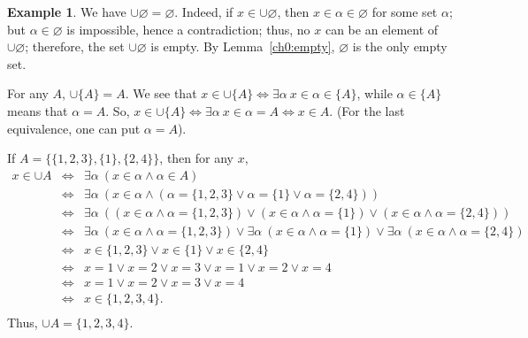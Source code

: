 \documentclass[12pt,notitlepage]{article}
\theoremstyle{plain}
\theoremstyle{definition}
\newtheorem{exm}[thm]{Example}
\theoremstyle{plain}
\newcommand{\void}{\varnothing}
\newcommand{\1}{\mathbf{1}}
\newcommand{\0}{\mathbf{0}}
\newcommand{\mcomm}[1]{}
\begin{document}
\begin{exm}\label{sets:fin_union}
We have $\cup \void = \void$. Indeed, if $x \in \cup \void$, then $x \in \alpha \in \void$ for some set $\alpha$; but $\alpha \in \void$ is impossible, hence a contradiction; thus, no $x$ can be an element of $\cup \void$; therefore, the set $\cup \void$ is empty. By Lemma~\ref{ch0:empty}, $\void$ is the only empty set.

For any $A$, $\cup \{ A \} = A$. We see that $x \in \cup \{ A\} \iff \exists \alpha\ x \in \alpha \in \{ A \}$, while $\alpha \in \{A \}$ means that $\alpha = A$. So, $x \in \cup \{ A\} \iff \exists \alpha\ x \in \alpha = A \iff x \in A$. (For the last equivalence, one can put $\alpha = A$).

If $A = \{ \{1,2,3\}, \{1\}, \{2,4\}\}$, then for any $x$,
$$
\begin{array}{rcl}
x \in \cup A &\iff& \exists \alpha\ (x \in \alpha \wedge \alpha \in A)\\
		&\iff& \exists \alpha\ (x \in \alpha \wedge (\alpha = \{1,2,3\} \vee \alpha = \{1\} \vee \alpha = \{2,4\}))\\
		&\iff& \exists \alpha\ ((x \in \alpha \wedge \alpha = \{1,2,3\}) \vee (x \in \alpha \wedge \alpha = \{1\}) \vee (x \in \alpha \wedge \alpha = \{2,4\}))\\
		&\iff& \exists \alpha\ (x \in \alpha \wedge \alpha = \{1,2,3\}) \vee \exists \alpha\ (x \in \alpha \wedge \alpha = \{1\}) \vee \exists \alpha\ (x \in \alpha \wedge \alpha = \{2,4\})\\
		&\iff& x \in \{1,2,3\}  \vee   x \in \{1\} \vee x \in \{2,4\} \\
		&\iff& x = 1 \vee x = 2 \vee x = 3 \vee x = 1 \vee x = 2 \vee x = 4\\
		&\iff& x = 1 \vee x = 2 \vee x = 3 \vee x = 4\\
		&\iff& x \in \{1,2,3,4\}.\\
\end{array}
$$
Thus, $\cup A = \{1,2,3,4\}$.

\mcomm{For the above argument, the Instructor might wish to explain a few logical equivalences: $\exists x\, (A \vee B) \equiv \exists x\, A \vee \exists x\, B$ and $\exists x\, (A(x) \wedge x = t) \equiv A(t)$.}
\end{exm}
\end{document}
